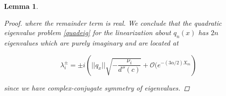 \documentclass[12pt]{article}
\newtheorem{lemma}{Lemma}
\begin{document}
\begin{lemma}
\begin{proof}
where the remainder term is real. We conclude that the quadratic eigenvalue problem \eqref{quadeig} for the linearization about $q_n(x)$ has $2n$ eigenvalues which are purely imaginary and are located at

\begin{equation}
\lambda_i^\pm = \pm i \left( ||q_x|| \sqrt{ -\frac{ \nu_i}{d''(c)} } + \mathcal{O}(e^{-(3 \alpha/2) X_m} \right)
\end{equation}

since we have complex-conjugate symmetry of eigenvalues.

\end{proof}
\end{lemma}



\end{document}
